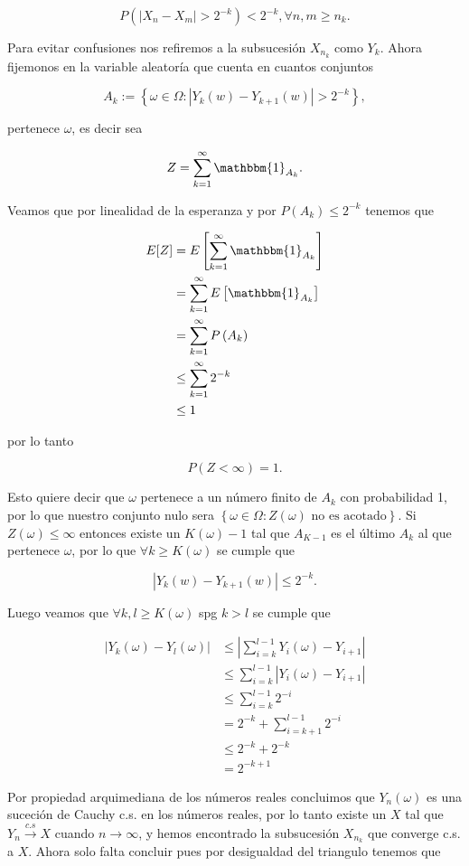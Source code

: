 \documentclass[letterpaper]{article}
\newcommand{\abs}[1]{\left| #1 \right| }
\newcommand{\pars}[1]{\left( #1 \right) }
\newcommand{\bracs}[1]{\left[ #1 \right] }
\newcommand{\set}[1]{\left \{ #1 \right\} }
\newcommand{\1}{\mathbbm{1}}
\begin{document}
\begin{enumerate}
\begin{enumerate}
			\[P\pars{\abs{X_n - X_m} > 2^{-k}} < 2^{-k}, \forall n,m \geq n_k.\]


			Para evitar confusiones nos refiremos a la subsucesión $X_{n_k}$ como $Y_k$. Ahora fijemonos en la variable aleatoría que cuenta en cuantos conjuntos 

			\[A_k := \set{\omega \in \Omega : \abs{Y_{k}(w) - Y_{k+1}(w)} > 2^{-k}},\]

			pertenece $\omega$, es decir sea

			\[Z = \sum_{k=1}^\infty \mathbbm{1}_{A_k}.\]

			Veamos que por linealidad de la esperanza y por $P(A_k) \leq 2^{-k}$ tenemos que

			\begin{align*}
				E[Z] &= E\bracs{\sum_{k=1}^\infty \mathbbm{1}_{A_k}}\\
				&= \sum_{k=1}^\infty E\bracs{\mathbbm{1}_{A_k}}\\
				&= \sum_{k=1}^\infty P\pars{A_k}\\
				&\leq \sum_{k=1}^\infty 2^{-k}\\
				&\leq 1
			\end{align*}

			por lo tanto

			\[P(Z < \infty) = 1.\]

			Esto quiere decir que $\omega$ pertenece a un número finito de $A_k$ con probabilidad 1, por lo que nuestro conjunto nulo sera $\set{\omega\in\Omega: Z(\omega) \text{ no es acotado}}$. Si $Z(\omega) \leq \infty$ entonces existe un $K(\omega)-1$ tal que $A_{K-1}$ es el último $A_k$ al que pertenece $\omega$, por lo que $\forall k \geq K(\omega)$ se cumple que

			\[\abs{Y_k(w) - Y_{k+1}(w)} \leq 2^{-k}.\]

			Luego veamos que $\forall k,l \geq K(\omega)$ spg $k>l$ se cumple que

			\begin{align*}
				\abs{Y_k(\omega)-Y_l(\omega)} &\leq \abs{\sum_{i=k}^{l-1} Y_i(\omega)-Y_{i+1}}\\
				&\leq \sum_{i=k}^{l-1} \abs{Y_i(\omega)-Y_{i+1}}\\
				&\leq \sum_{i=k}^{l-1} 2^{-i}\\
				&= 2^{-k} + \sum_{i=k+1}^{l-1} 2^{-i}\\
				&\leq 2^{-k} + 2^{-k}\\
				&= 2^{-k+1}	
			\end{align*}

			Por propiedad arquimediana de los números reales concluimos que $Y_n(\omega)$ es una suceción de Cauchy c.s. en los números reales, por lo tanto existe un $X$ tal que $Y_n \xrightarrow{c.s} X$ cuando $n \rightarrow \infty$, y hemos encontrado la subsucesión $X_{n_k}$ que converge c.s. a $X$. Ahora solo falta concluir pues por desigualdad del triangulo tenemos que


\end{enumerate}
\end{enumerate}
\end{document}
